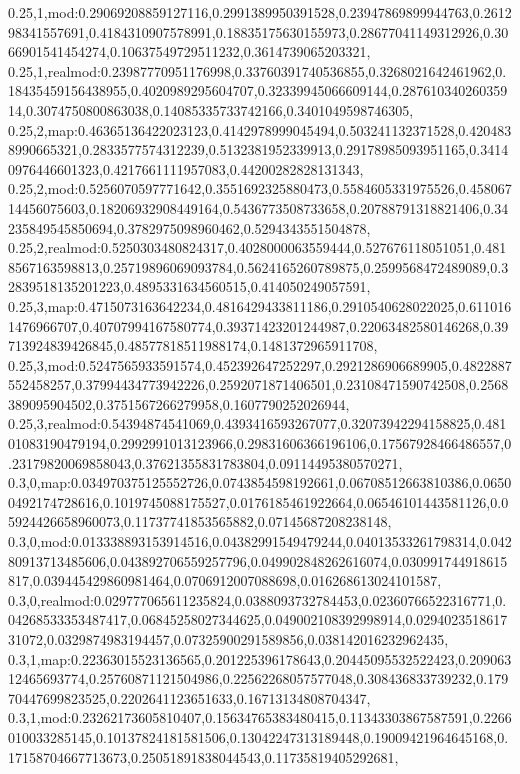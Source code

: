 0.25,1,mod:0.29069208859127116,0.2991389950391528,0.23947869899944763,0.261298341557691,0.4184310907578991,0.18835175630155973,0.28677041149312926,0.3066901541454274,0.10637549729511232,0.3614739065203321,
0.25,1,realmod:0.23987770951176998,0.33760391740536855,0.3268021642461962,0.18435459156438955,0.4020989295604707,0.32339945066609144,0.28761034026035914,0.3074750800863038,0.14085335733742166,0.3401049598746305,
0.25,2,map:0.46365136422023123,0.4142978999045494,0.503241132371528,0.4204838990665321,0.2833577574312239,0.5132381952339913,0.29178985093951165,0.34140976446601323,0.4217661111957083,0.44200282828131343,
0.25,2,mod:0.5256070597771642,0.3551692325880473,0.5584605331975526,0.45806714456075603,0.18206932908449164,0.5436773508733658,0.20788791318821406,0.34235849545850694,0.3782975098960462,0.5294343551504878,
0.25,2,realmod:0.5250303480824317,0.4028000063559444,0.527676118051051,0.4818567163598813,0.25719896069093784,0.5624165260789875,0.2599568472489089,0.32839518135201223,0.4895331634560515,0.414050249057591,
0.25,3,map:0.4715073163642234,0.4816429433811186,0.2910540628022025,0.6110161476966707,0.40707994167580774,0.39371423201244987,0.22063482580146268,0.39713924839426845,0.48577818511988174,0.1481372965911708,
0.25,3,mod:0.5247565933591574,0.452392647252297,0.2921286906689905,0.4822887552458257,0.37994434773942226,0.2592071871406501,0.23108471590742508,0.2568389095904502,0.3751567266279958,0.1607790252026944,
0.25,3,realmod:0.54394874541069,0.4393416593267077,0.32073942294158825,0.48101083190479194,0.2992991013123966,0.29831606366196106,0.17567928466486557,0.23179820069858043,0.37621355831783804,0.09114495380570271,
0.3,0,map:0.034970375125552726,0.0743854598192661,0.06708512663810386,0.06500492174728616,0.1019745088175527,0.0176185461922664,0.06546101443581126,0.05924426658960073,0.11737741853565882,0.07145687208238148,
0.3,0,mod:0.013338893153914516,0.04382991549479244,0.04013533261798314,0.04280913713485606,0.043892706559257796,0.049902848262616074,0.030991744918615817,0.039445429860981464,0.0706912007088698,0.016268613024101587,
0.3,0,realmod:0.029777065611235824,0.0388093732784453,0.02360766522316771,0.04268533353487417,0.06845258027344625,0.049002108392998914,0.029402351861731072,0.0329874983194457,0.07325900291589856,0.038142016232962435,
0.3,1,map:0.22363015523136565,0.201225396178643,0.20445095532522423,0.20906312465693774,0.25760871121504986,0.22562268057577048,0.308436833739232,0.17970447699823525,0.2202641123651633,0.16713134808704347,
0.3,1,mod:0.23262173605810407,0.15634765383480415,0.11343303867587591,0.2266010033285145,0.10137824181581506,0.13042247313189448,0.19009421964645168,0.17158704667713673,0.25051891838044543,0.11735819405292681,
